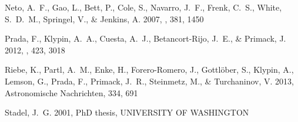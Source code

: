 \documentclass{emulateapj}
\begin{document}
\begin{thebibliography}{15}
{Neto}, A.~F., {Gao}, L., {Bett}, P., {Cole}, S., {Navarro}, J.~F., {Frenk},
  C.~S., {White}, S.~D.~M., {Springel}, V., \& {Jenkins}, A. 2007, \mnras, 381,
  1450

{Prada}, F., {Klypin}, A.~A., {Cuesta}, A.~J., {Betancort-Rijo}, J.~E., \&
  {Primack}, J. 2012, \mnras, 423, 3018

{Riebe}, K., {Partl}, A.~M., {Enke}, H., {Forero-Romero}, J., {Gottl{\"o}ber},
  S., {Klypin}, A., {Lemson}, G., {Prada}, F., {Primack}, J.~R., {Steinmetz},
  M., \& {Turchaninov}, V. 2013, Astronomische Nachrichten, 334, 691

{Stadel}, J.~G. 2001, PhD thesis, UNIVERSITY OF WASHINGTON

\end{thebibliography}
\end{document}
